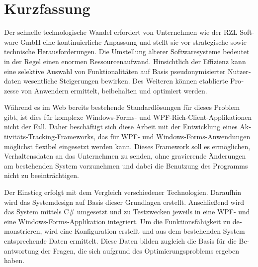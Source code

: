 \chapter{Kurzfassung}
\label{cha:abstract}

\begin{german}

Der schnelle technologische Wandel erfordert von Unternehmen wie der RZL Software GmbH eine kontinuierliche Anpassung und stellt sie vor strategische sowie technische Herausforderungen. Die Umstellung älterer Softwaresysteme bedeutet in der Regel einen enormen Ressourcenaufwand. Hinsichtlich der Effizienz kann eine selektive Auswahl von Funktionalitäten auf Basis pseudonymisierter Nutzerdaten wesentliche Steigerungen bewirken. Des Weiteren können etablierte Prozesse von Anwendern ermittelt, beibehalten und optimiert werden.

Während es im Web bereits bestehende Standardlösungen für dieses Problem gibt, ist dies für komplexe Windows-Forms- und WPF-Rich-Client-Applikationen nicht der Fall. Daher beschäftigt sich diese Arbeit mit der Entwicklung eines Aktivitäts-Tracking-Frameworks, das für WPF- und Windows-Forms-Anwendungen möglichst flexibel eingesetzt werden kann. Dieses Framework soll es ermöglichen, Verhaltensdaten an das Unternehmen zu senden, ohne gravierende Änderungen am bestehenden System vorzunehmen und dabei die Benutzung des Programms nicht zu beeinträchtigen.

Der Einstieg erfolgt mit dem Vergleich verschiedener Technologien. Daraufhin wird das Systemdesign auf Basis dieser Grundlagen erstellt. Anschließend wird das System mittels C\# umgesetzt und zu Testzwecken jeweils in eine WPF- und eine Windows-Forms-Applikation integriert. Um die Funktionsfähigkeit zu demonstrieren, wird eine Konfiguration erstellt und aus dem bestehenden System entsprechende Daten ermittelt. Diese Daten bilden zugleich die Basis für die Beantwortung der Fragen, die sich aufgrund des Optimierungsproblems ergeben haben.

\end{german}

